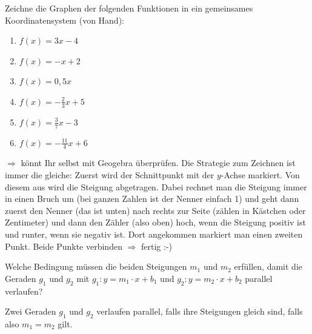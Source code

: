 \documentclass[a4paper,ngerman,12pt]{exam}
\begin{document}
\begin{questions}
  \printanswers
  \question %
  Zeichne die Graphen der folgenden Funktionen in ein gemeinsames Koordinatensystem (von Hand):\newline
  \hspace{0.6cm}\begin{minipage}{5cm}
    \begin{enumerate}[label=\alph*)]
      \item $f(x)=3x-4$
      \item $f(x)=-x+2$
    \end{enumerate}
  \end{minipage}
  \begin{minipage}{5cm}
    \begin{enumerate}[label=\alph*)]
      \setcounter{enumi}{2}
      \item $f(x)=0{,}5x$
      \item $\displaystyle f(x)=-\frac{2}{3}x+5$
    \end{enumerate}
  \end{minipage}
  \begin{minipage}{5cm}
    \begin{enumerate}[label=\alph*)]
      \setcounter{enumi}{4}
      \item $\displaystyle f(x)=\frac{3}{7}x-3$
      \item $\displaystyle f(x)=-\frac{11}{4}x+6$
    \end{enumerate}
  \end{minipage}

  \begin{solution}
    $\Rightarrow$ könnt Ihr selbst mit Geogebra überprüfen. Die Strategie zum Zeichnen ist immer die gleiche: Zuerst wird der Schnittpunkt mit der $y$-Achse markiert. Von diesem aus wird die Steigung abgetragen. Dabei rechnet man die Steigung immer in einen Bruch um (bei ganzen Zahlen ist der Nenner einfach 1) und geht dann zuerst den Nenner (das ist unten) nach rechts zur Seite (zählen in Kästchen oder Zentimeter) und dann den Zähler (also oben) hoch, wenn die Steigung positiv ist und runter, wenn sie negativ ist. Dort angekommen markiert man einen zweiten Punkt. Beide Punkte verbinden $\Rightarrow$ fertig :-)
  \end{solution}

  \question %
  Welche Bedingung müssen die beiden Steigungen $m_1$ und $m_2$ erfüllen, damit die Geraden $g_1$ und $g_2$ mit $g_1: y=m_1\cdot x+b_1$ und $g_2: y=m_2\cdot x+b_2$ parallel verlaufen?\newline
  \begin{solution}
    Zwei Geraden $g_1$ und $g_2$ verlaufen parallel, falls ihre Steigungen gleich sind, falls also $m_1=m_2$ gilt.


\end{solution}
\end{questions}
\end{document}
